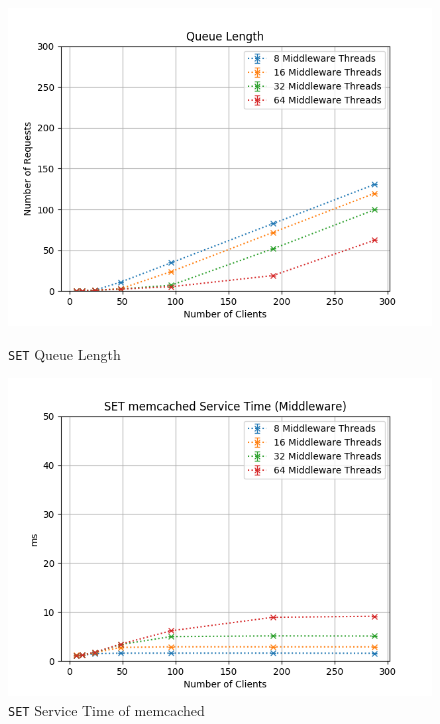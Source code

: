\documentclass[11pt,a4paper]{article}
\begin{document}
\begin{figure}[H]
	\centering
	\captionsetup{width=0.4\textwidth}
    \begin{minipage}{0.5\textwidth}
        \includegraphics[width=\textwidth]{../illustrations/plots/3_1_full_system_write/1-0/middleware_queue_length.png}
        \caption{\texttt{SET} Queue Length}
        \label{fig:full_system_write_set_ql}
    \end{minipage}\hfill
    \begin{minipage}{0.5\textwidth}
        \centering
        \includegraphics[width=\textwidth]{../illustrations/plots/3_1_full_system_write/1-0/middleware_set_service_time_ms.png}
        \caption{\texttt{SET} Service Time of memcached}
        \label{fig:full_system_write_set_st_mw}
    \end{minipage}
\end{figure}
\end{document}
